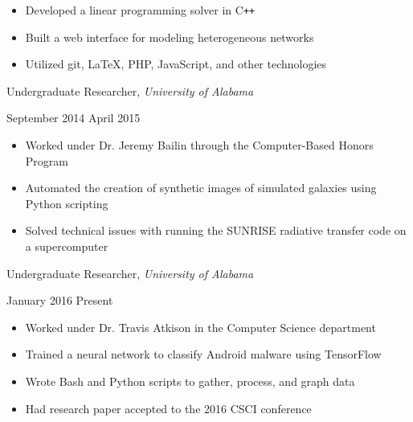 \documentclass[11pt]{article}
\begin{document}
\begin{itemize}
  \item Developed a linear programming solver in C\texttt{++}
  \item Built a web interface for modeling heterogeneous networks
  \item Utilized git, \LaTeX, PHP, JavaScript, and other technologies
\end{itemize}

\vspace{0.4em}
\begin{minipage}[t]{0.65\textwidth}
\flushleft
Undergraduate Researcher, \textit{University of Alabama}\\
\end{minipage}
\begin{minipage}[t]{0.30\textwidth}
\flushright
September 2014 \space \textemdash \space April 2015\\
\end{minipage}

\begin{itemize}
  \item Worked under Dr. Jeremy Bailin through the Computer-Based Honors Program
  \item Automated the creation of synthetic images of simulated galaxies using Python scripting
  \item Solved technical issues with running the SUNRISE radiative transfer code on a supercomputer
\end{itemize}

\vspace{0.4em}
\begin{minipage}[t]{0.65\textwidth}
\flushleft
Undergraduate Researcher, \textit{University of Alabama}\\
\end{minipage}
\begin{minipage}[t]{0.30\textwidth}
\flushright
January 2016 \space \textemdash \space Present\\
\end{minipage}

\begin{itemize}
  \item Worked under Dr. Travis Atkison in the Computer Science department
  \item Trained a neural network to classify Android malware using TensorFlow
  \item Wrote Bash and Python scripts to gather, process, and graph data
  \item Had research paper accepted to the 2016 CSCI conference
\end{itemize}
\end{document}
